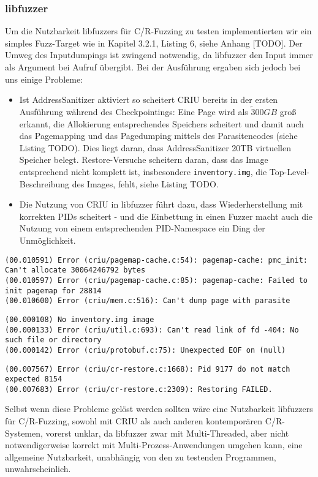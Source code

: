 \documentclass[a4paper]{article}
\begin{document}
\subsubsection{libfuzzer}
Um die Nutzbarkeit libfuzzers für C/R-Fuzzing zu testen implementierten wir ein simples Fuzz-Target wie in Kapitel 3.2.1, Listing 6, siehe Anhang [TODO]. Der Umweg des Inputdumpings ist zwingend notwendig, da libfuzzer den Input immer als Argument bei Aufruf übergibt. Bei der Ausführung ergaben sich jedoch bei uns einige Probleme:
\begin{itemize}
    \item Ist AddressSanitizer aktiviert so scheitert CRIU bereits in der ersten Ausführung während des Checkpointings: Eine Page wird als $\tilde 300GB$ groß erkannt, die Allokierung entsprechendes Speichers scheitert und damit auch das Pagemapping und das Pagedumping mittels des Parasitencodes (siehe Listing TODO). Dies liegt daran, dass AddressSanitizer 20TB virtuellen Speicher belegt. Restore-Versuche scheitern daran, dass das Image entsprechend nicht komplett ist, insbesondere \texttt{inventory.img}, die Top-Level-Beschreibung des Images, fehlt, siehe Listing TODO. %
    \item Die Nutzung von CRIU in libfuzzer führt dazu, dass Wiederherstellung mit korrekten PIDs scheitert - und die Einbettung in einen Fuzzer macht auch die Nutzung von einem entsprechenden PID-Namespace ein Ding der Unmöglichkeit.
\end{itemize}
\begin{lstlisting}[caption=Pagemapping/dumping Errors mit ASan]
(00.010591) Error (criu/pagemap-cache.c:54): pagemap-cache: pmc_init: Can't allocate 30064246792 bytes
(00.010597) Error (criu/pagemap-cache.c:85): pagemap-cache: Failed to init pagemap for 28814
(00.010600) Error (criu/mem.c:516): Can't dump page with parasite
\end{lstlisting}
\begin{lstlisting}[caption=Restoring Error mit ASan]
(00.000108) No inventory.img image
(00.000133) Error (criu/util.c:693): Can't read link of fd -404: No such file or directory
(00.000142) Error (criu/protobuf.c:75): Unexpected EOF on (null)
\end{lstlisting}
\begin{lstlisting}[caption=Restoring Error durch PID mismatch]
(00.007567) Error (criu/cr-restore.c:1668): Pid 9177 do not match expected 8154
(00.007683) Error (criu/cr-restore.c:2309): Restoring FAILED.
\end{lstlisting}
Selbst wenn diese Probleme gelöst werden sollten wäre eine Nutzbarkeit libfuzzers für C/R-Fuzzing, sowohl mit CRIU als auch anderen kontemporären C/R-Systemen, vorerst unklar, da libfuzzer zwar mit Multi-Threaded, aber nicht notwendigerweise korrekt mit Multi-Prozess-Anwendungen umgehen kann, eine allgemeine Nutzbarkeit, unabhängig von den zu testenden Programmen, unwahrscheinlich.
\end{document}
